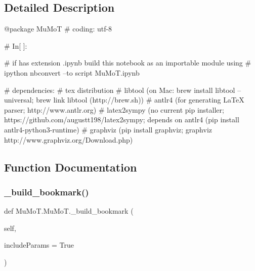 \subsection{Detailed Description}
\begin{DoxyVerb}@package MuMoT
# coding: utf-8

# In[ ]:

# if has extension .ipynb build this notebook as an importable module using
# ipython nbconvert --to script MuMoT.ipynb

# dependencies:
#  tex distribution
#  libtool (on Mac: brew install libtool --universal; brew link libtool (http://brew.sh))
#  antlr4 (for generating LaTeX parser; http://www.antlr.org)
#  latex2sympy (no current pip installer; https://github.com/augustt198/latex2sympy; depends on antlr4 (pip install antlr4-python3-runtime)
#  graphviz (pip install graphviz; graphviz http://www.graphviz.org/Download.php)
\end{DoxyVerb}
 

\subsection{Function Documentation}
\mbox{\label{namespace_mu_mo_t_1_1_mu_mo_t_a85df0ce1bbaa77b9e7bb2c86580ddbb1}} 
\subsubsection{\texorpdfstring{\+\_\+build\+\_\+bookmark()}{\_build\_bookmark()}}
{\footnotesize\ttfamily def Mu\+Mo\+T.\+Mu\+Mo\+T.\+\_\+build\+\_\+bookmark (\begin{DoxyParamCaption}\item[{}]{self,  }\item[{}]{include\+Params = {\ttfamily True} }\end{DoxyParamCaption})\hspace{0.3cm}{\ttfamily [private]}}

\mbox{\label{namespace_mu_mo_t_1_1_mu_mo_t_aada27c31be7a76cff44cfae711dcfec1}} 
